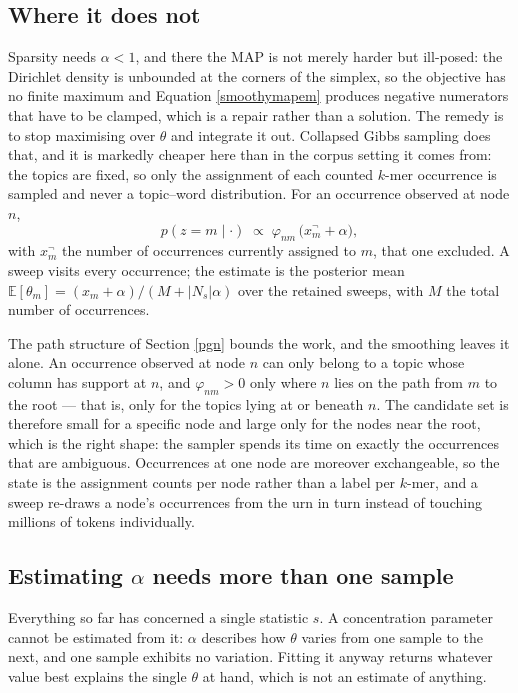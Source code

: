 \documentclass[pdflatex,sn-vancouver-num]{sn-jnl}
\begin{document}
\begin{appendices}
    \subsection{Where it does not}\label{gibbs}
    Sparsity needs $\alpha < 1$, and there the MAP is not merely harder
    but ill-posed: the Dirichlet density is unbounded at the corners of the simplex, so the objective
    has no finite maximum and Equation \eqref{smoothymapem} produces negative numerators that have to
    be clamped, which is a repair rather than a solution. The remedy is to stop maximising over
    $\theta$ and integrate it out. Collapsed Gibbs sampling \citep{griffiths2004scientific} does that, and it is markedly cheaper here
    than in the corpus setting it comes from: the topics are fixed, so only the assignment of each
    counted $k$-mer occurrence is sampled and never a topic--word distribution. For an occurrence
    observed at node $n$,
    \begin{equation}\label{smoothygibbs}
        p(z = m \mid \cdot) \;\propto\; \varphi_{nm} \, \bigl( x_m^{\neg} + \alpha \bigr),
    \end{equation}
    with $x_m^{\neg}$ the number of occurrences currently assigned to $m$, that one excluded. A sweep
    visits every occurrence; the estimate is the posterior mean
    $\mathbb{E}[\theta_m] = (x_m + \alpha) / (M + \lvert N_s \rvert \alpha)$ over the retained sweeps,
    with $M$ the total number of occurrences.

    The path structure of Section \ref{pgn} bounds the work, and the smoothing leaves it alone. An
    occurrence observed at node $n$ can only belong to a topic whose column has support at $n$, and
    $\varphi_{nm} > 0$ only where $n$ lies on the path from $m$ to the root --- that is, only for the
    topics lying at or beneath $n$. The candidate set is therefore small for a specific node and
    large only for the nodes near the root, which is the right shape: the sampler spends its time on
    exactly the occurrences that are ambiguous.
    Occurrences at one node are moreover exchangeable, so the state is the assignment counts per node
    rather than a label per $k$-mer, and a sweep re-draws a node's occurrences from the urn in turn
    instead of touching millions of tokens individually.

    \subsection{Estimating \texorpdfstring{$\alpha$}{alpha} needs more than one sample}
    Everything so
    far has concerned a single statistic $s$. A concentration parameter cannot be estimated from it:
    $\alpha$ describes how $\theta$ varies from one sample to the next, and one sample exhibits no
    variation. Fitting it anyway returns whatever value best explains the single $\theta$ at hand,
    which is not an estimate of anything.


\end{appendices}
\end{document}
